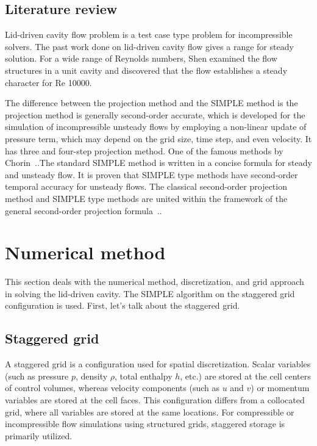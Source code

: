 \documentclass{article}
\numberwithin{equation}{section}
\numberwithin{figure}{section}
\begin{document}
\subsection{Literature review}
Lid-driven cavity flow problem is a test case type problem for 
incompressible solvers. The past work done on lid-driven cavity 
flow gives a range for steady solution. For a wide range of 
Reynolds numbers, Shen \cite{shen1991hopf} examined the flow structures in a 
unit cavity and discovered that the flow establishes a steady 
character for Re 10000.

The difference between the projection method and the SIMPLE method 
is the projection method is generally second-order accurate, which 
is developed for the simulation of incompressible unsteady flows 
by employing a non-linear update of pressure term, which may depend 
on the grid size, time step, and even velocity. It has three and 
four-step projection method. One of the famous methods by 
Chorin~.\cite{chorin1997numerical}.The standard SIMPLE method is written 
in a concise formula for steady and unsteady flow. It is proven that SIMPLE 
type methods have second-order temporal accuracy for unsteady flows. The 
classical second-order projection method and SIMPLE type methods are 
united within the framework of the general second-order projection formula~.\cite{ni2007bridge}. 


\section{Numerical method}
This section deals with the numerical method, discretization, and grid approach in solving 
the lid-driven cavity. The SIMPLE algorithm on the staggered grid configuration 
is used. First, let’s talk about the staggered grid. 
\subsection{Staggered grid}
A staggered grid is a configuration used for spatial discretization. Scalar 
variables (such as pressure \( p \), density \( \rho \), total enthalpy \( h \), etc.) 
are stored at the cell centers of control volumes, whereas velocity components (such as 
\( u \) and \( v \)) or momentum variables are stored at the cell faces. This configuration 
differs from a collocated grid, where all variables are stored at the same locations. For 
compressible or incompressible flow simulations using structured grids, staggered storage is primarily utilized.
\end{document}

